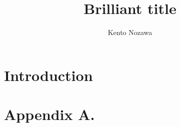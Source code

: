 \documentclass{article}
\begin{document}
\title{Brilliant title}

\author{Kento Nozawa}

\maketitle

\begin{abstract}

\end{abstract}


\section{Introduction}

\newpage

\appendix
\section*{Appendix A.}
\label{app:theorem}

\vskip 0.2in


\end{document}
